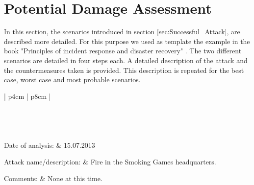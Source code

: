 \section{Potential Damage Assessment}\label{sec:PotentDamAsses}

In this section, the scenarios introduced in section \ref{sec:Successful_Attack}, are described more detailed. For this purpose we used as template the example in the book "Principles of incident response and disaster recovery" \cite {whitman5}. The two different scenarios are detailed in four steps each. A detailed description of the attack and the countermeasures taken is provided. This description is repeated for the best case, worst case and most probable scenarios.

\begin{longtable}{| p{4cm} | p{8cm} |}
	\hline {}\\\hline
	\endfirsthead
	
	\hline {}\\\hline
	\endhead
	
	\\\hline
	\endfoot
	
	\endlastfoot
	
	Date of analysis: & 15.07.2013 \\\hline
	
	Attack name/description: &  Fire in the Smoking Games headquarters.\\\hline
	
	Comments: & None at this time.\\\hline
	
	\\\hline
	
\end{longtable}
